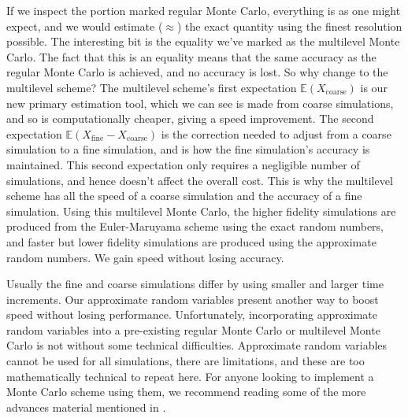 \documentclass[11pt,a4paper,twoside,english]{extarticle}
\begin{document}
If we inspect the portion marked regular Monte Carlo, everything is as one might expect, and we would estimate ($ \approx $) the exact quantity using the finest resolution possible. The interesting bit is the equality we've marked as the multilevel Monte Carlo. The fact that this is an equality means that the same accuracy as the regular Monte Carlo is achieved, and no accuracy is lost. So why change to the multilevel scheme? The multilevel scheme's first expectation $ \mathbb{E}(X_{\mathrm{coarse}}) $ is our new primary estimation tool, which we can see is made from coarse simulations, and so is computationally  cheaper, giving a speed improvement. The second expectation $ \mathbb{E}(X_{\mathrm{fine}} - X_{\mathrm{coarse}}) $ is the correction needed to adjust from a coarse simulation to a fine simulation, and is how the fine simulation's accuracy is maintained. This second expectation only requires a negligible number of simulations, and hence doesn't affect the overall cost. This is why the multilevel scheme has all the speed of a coarse simulation and the accuracy of a fine simulation. Using this multilevel Monte Carlo, the higher fidelity simulations are produced from the Euler-Maruyama scheme using the exact random numbers, and faster but lower fidelity simulations are produced using the approximate random numbers. We gain speed without losing accuracy.

Usually the fine and coarse simulations differ by using smaller and larger time increments. Our approximate random variables present another way to boost speed without losing performance. Unfortunately, incorporating approximate random variables into a pre-existing regular Monte Carlo or multilevel Monte Carlo is not without some technical difficulties. Approximate random variables cannot be used for all simulations, there are limitations, and these are too mathematically technical to repeat here. For anyone looking to implement a  Monte Carlo scheme using them, we recommend reading some of the more advances material mentioned in .
\end{document}
